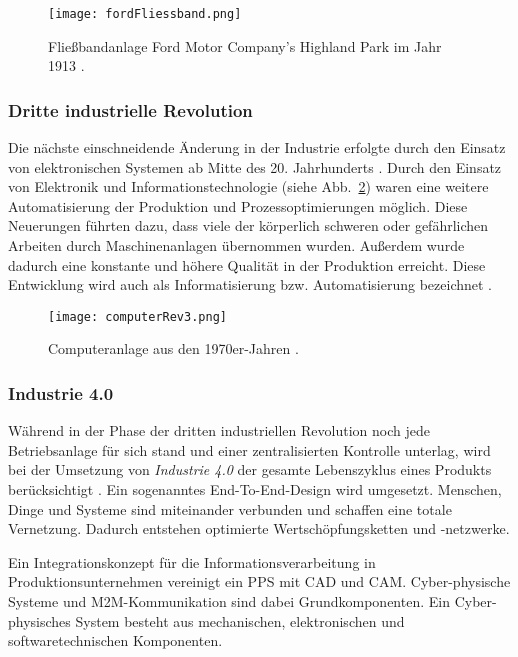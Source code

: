 \begin{figure}%
\centering
\texttt{[image: fordFliessband.png]} 
\caption{Fließbandanlage Ford Motor Company's Highland Park im Jahr 1913 \cite{FordAssemblyLine1913}.}
\label{fig:Fliessbandanlage}
\end{figure}

\subsubsection{Dritte industrielle Revolution}
Die nächste einschneidende Änderung in der Industrie erfolgte durch den Einsatz von elektronischen Systemen ab Mitte des 20. Jahrhunderts \parencite{andelfinger2017industrie}. Durch den Einsatz von Elektronik und Informationstechnologie (siehe Abb.~\ref{fig:Computeranlage}) waren eine weitere Automatisierung der Produktion und Prozessoptimierungen möglich. Diese Neuerungen führten dazu, dass viele der körperlich schweren oder gefährlichen Arbeiten durch Maschinenanlagen übernommen wurden. Außerdem wurde dadurch eine konstante und höhere Qualität in der Produktion erreicht. Diese Entwicklung wird auch als Informatisierung bzw. Automatisierung bezeichnet \parencite{hocker2015}. 

\begin{figure}%
\centering
\texttt{[image: computerRev3.png]} 
\caption{Computeranlage aus den 1970er-Jahren \cite{Spiegel}.}
\label{fig:Computeranlage}
\end{figure}

\subsubsection{Industrie 4.0}
Während in der Phase der dritten industriellen Revolution noch jede Betriebsanlage für sich stand und einer zentralisierten Kontrolle unterlag, wird bei der Umsetzung von \textit{Industrie 4.0} der gesamte Lebenszyklus eines Produkts berücksichtigt \parencite{andelfinger2017industrie}. Ein sogenanntes End-To-End-Design wird umgesetzt. Menschen, Dinge und Systeme sind miteinander verbunden und schaffen eine totale Vernetzung. Dadurch entstehen optimierte Wertschöpfungsketten und -netzwerke. 

Ein Integrationskonzept für die Informationsverarbeitung in Produktionsunternehmen vereinigt ein \acl{PPS} mit \acl{CAD} und \acl{CAM}. Cyber-physische Systeme und \acl{M2M}-Kommunikation sind dabei Grundkomponenten. Ein Cyber-physisches System besteht aus mechanischen, elektronischen und softwaretechnischen Komponenten. 


